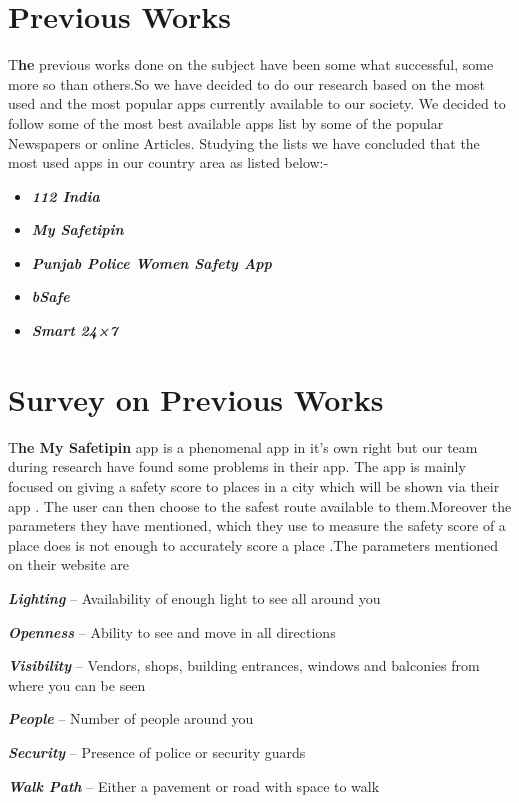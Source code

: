 \documentclass[	DIV=calc,%
							paper=a4,%
							fontsize=12pt,%
							twocolumn]{scrartcl}
\newcommand{\initial}[1]{%
     \lettrine[lines=3,lhang=0.3,nindent=0em]{
     				\color{DarkGoldenrod}
     				{\textsf{#1}}}{}}
\begin{document}
\section*{Previous Works}
\initial{T}\textbf{he} previous works done on the subject have been some what successful, some more so than others.So we have decided to do our research based on the most used and the most popular apps currently available to our society. We decided to follow some of the most best available apps list by some of the popular Newspapers or online Articles. Studying the lists we have concluded that the most used apps in our country area as listed below:-
\begin{itemize}
	\item{\textbf{\textit{ 112 India}}} 
	\item{\textbf{\textit{ My Safetipin}}}
	\item{\textbf{\textit{ Punjab Police Women Safety App}}}
	\item{\textbf{\textit{bSafe}}}
	\item{\textbf{\textit{Smart 24×7}}}
\end{itemize}
\section*{Survey on Previous Works}
\initial{T}\textbf{he My Safetipin} app is a phenomenal app in it's own right but our team during research have found some problems in their app. The app is mainly focused on giving a safety score to places in a city which will be shown via their app . The user can then choose to the safest route available to them.Moreover the parameters they have mentioned, which they use to measure the safety score  of a place does is not enough to accurately score a place .The parameters mentioned on their website are

\textbf{\textit{Lighting}} – Availability of enough light to see all around you

\textbf{\textit{Openness}} – Ability to see and move in all directions

\textbf{\textit{Visibility}} – Vendors, shops, building entrances, windows and balconies from where you can be seen

\textbf{\textit{People}} – Number of people around you

\textbf{\textit{Security}} – Presence of police or security guards

\textbf{\textit{Walk Path}} – Either a pavement or road with space to walk
\end{document}
